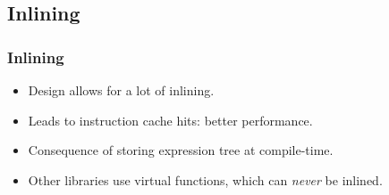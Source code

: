 \subsection{Inlining}
\frame{\tableofcontents[currentsubsection]}

\begin{frame}
\frametitle{Inlining}
\begin{itemize}
    
\item Design allows for a lot of inlining.
\item Leads to instruction cache hits: better performance.
\item Consequence of storing expression tree at compile-time.
\item Other libraries use virtual functions, which can \emph{never} be inlined.

\end{itemize}
\end{frame}
